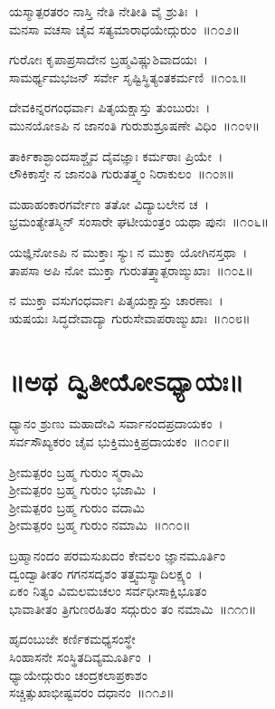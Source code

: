 ಯಸ್ಮಾತ್ಪರತರಂ ನಾಸ್ತಿ ನೇತಿ ನೇತೀತಿ ವೈ ಶ್ರುತಿಃ~।\\
ಮನಸಾ ವಚಸಾ ಚೈವ ಸತ್ಯಮಾರಾಧಯೇದ್ಗುರುಂ~॥೧೦೨॥

ಗುರೋಃ ಕೃಪಾಪ್ರಸಾದೇನ ಬ್ರಹ್ಮವಿಷ್ಣುಶಿವಾದಯಃ~।\\
ಸಾಮರ್ಥ್ಯಮಭಜನ್ ಸರ್ವೇ ಸೃಷ್ಟಿಸ್ಥಿತ್ಯಂತಕರ್ಮಣಿ~॥೧೦೩॥

ದೇವಕಿನ್ನರಗಂಧರ್ವಾಃ ಪಿತೃಯಕ್ಷಾಸ್ತು ತುಂಬುರುಃ~।\\
ಮುನಯೋಽಪಿ ನ ಜಾನಂತಿ ಗುರುಶುಶ್ರೂಷಣೇ ವಿಧಿಂ~॥೧೦೪॥

ತಾರ್ಕಿಕಾಶ್ಛಾಂದಸಾಶ್ಚೈವ ದೈವಜ್ಞಾಃ ಕರ್ಮಠಾಃ ಪ್ರಿಯೇ~।\\
ಲೌಕಿಕಾಸ್ತೇ ನ ಜಾನಂತಿ ಗುರುತತ್ತ್ವಂ ನಿರಾಕುಲಂ~॥೧೦೫॥

ಮಹಾಹಂಕಾರಗರ್ವೇಣ ತತೋ ವಿದ್ಯಾಬಲೇನ ಚ~।\\
ಭ್ರಮಂತ್ಯೇತಸ್ಮಿನ್ ಸಂಸಾರೇ ಘಟೀಯಂತ್ರಂ ಯಥಾ ಪುನಃ~॥೧೦೬॥

ಯಜ್ಞಿನೋಽಪಿ ನ ಮುಕ್ತಾಃ ಸ್ಯುಃ ನ ಮುಕ್ತಾ ಯೋಗಿನಸ್ತಥಾ~।\\
ತಾಪಸಾ ಅಪಿ ನೋ ಮುಕ್ತಾ ಗುರುತತ್ತ್ವಾತ್ಪರಾಙ್ಮುಖಾಃ~॥೧೦೭॥

ನ ಮುಕ್ತಾ ವಸುಗಂಧರ್ವಾಃ ಪಿತೃಯಕ್ಷಾಸ್ತು ಚಾರಣಾಃ~।\\
ಋಷಯಃ ಸಿದ್ಧದೇವಾದ್ಯಾ ಗುರುಸೇವಾಪರಾಙ್ಮುಖಾಃ~॥೧೦೮॥

\section{॥ಅಥ ದ್ವಿತೀಯೋಽಧ್ಯಾಯಃ॥}

ಧ್ಯಾನಂ ಶ್ರುಣು ಮಹಾದೇವಿ ಸರ್ವಾನಂದಪ್ರದಾಯಕಂ~।\\
ಸರ್ವಸೌಖ್ಯಕರಂ ಚೈವ ಭುಕ್ತಿಮುಕ್ತಿಪ್ರದಾಯಕಂ~॥೧೦೯॥

ಶ್ರೀಮತ್ಪರಂ ಬ್ರಹ್ಮ ಗುರುಂ ಸ್ಮರಾಮಿ\\ ಶ್ರೀಮತ್ಪರಂ ಬ್ರಹ್ಮ ಗುರುಂ ಭಜಾಮಿ~।\\
ಶ್ರೀಮತ್ಪರಂ ಬ್ರಹ್ಮ ಗುರುಂ ವದಾಮಿ\\ ಶ್ರೀಮತ್ಪರಂ ಬ್ರಹ್ಮ ಗುರುಂ ನಮಾಮಿ~॥೧೧೦॥

ಬ್ರಹ್ಮಾನಂದಂ ಪರಮಸುಖದಂ ಕೇವಲಂ ಜ್ಞಾನಮೂರ್ತಿಂ\\
ದ್ವಂದ್ವಾತೀತಂ ಗಗನಸದೃಶಂ ತತ್ತ್ವಮಸ್ಯಾದಿಲಕ್ಷ್ಯಂ~।\\
ಏಕಂ ನಿತ್ಯಂ ವಿಮಲಮಚಲಂ ಸರ್ವಧೀಸಾಕ್ಷಿಭೂತಂ\\
ಭಾವಾತೀತಂ ತ್ರಿಗುಣರಹಿತಂ ಸದ್ಗುರುಂ ತಂ ನಮಾಮಿ~॥೧೧೧॥

ಹೃದಂಬುಜೇ ಕರ್ಣಿಕಮಧ್ಯಸಂಸ್ಥೇ\\ ಸಿಂಹಾಸನೇ ಸಂಸ್ಥಿತದಿವ್ಯಮೂರ್ತಿಂ~।\\
ಧ್ಯಾಯೇದ್ಗುರುಂ ಚಂದ್ರಕಲಾಪ್ರಕಾಶಂ\\ ಸಚ್ಚಿತ್ಸುಖಾಭೀಷ್ಟವರಂ ದಧಾನಂ~॥೧೧೨॥

